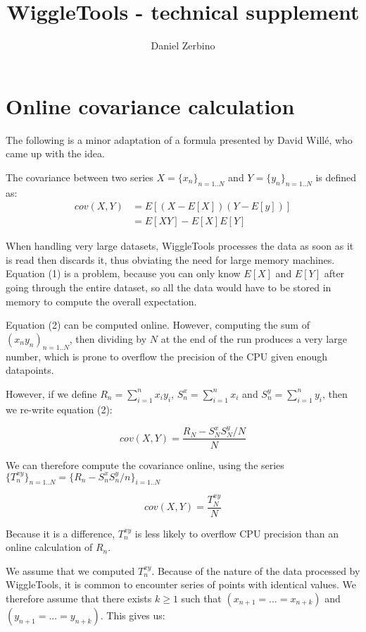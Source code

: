\documentclass[12pt]{article}
\begin{document}
\title{WiggleTools - technical supplement}
\author{Daniel Zerbino}
\maketitle

\section{Online covariance calculation}

The following is a minor adaptation of a formula presented by David Will\'e, who came up with the idea. 

The covariance between two series $X = \{x_n\}_{n=1..N}$ and $Y = \{y_n\}_{n=1..N}$ is defined as: 
\begin{align}
cov(X,Y) &= E[(X-E[X])(Y-E[y])] \\
               &= E[XY] - E[X]E[Y]
\end{align}

When handling very large datasets, WiggleTools processes the data as soon as it is read then discards it, thus obviating the need for large memory machines. Equation (1) is a problem, because you can only know $E[X]$ and $E[Y]$ after going through the entire dataset, so all the data would have to be stored in memory to compute the overall expectation.

Equation (2) can be computed online. However, computing the sum of $(x_ny_n)_{n=1..N}$, then dividing by $N$ at the end of the run produces a very large number, which is prone to overflow the precision of the CPU given enough datapoints. 

However, if we define $R_n = \sum_{i=1}^n x_iy_i$, $S_n^x =  \sum_{i=1}^n x_i$ and $S_n^y =  \sum_{i=1}^n y_i$, then we re-write equation (2):

$$cov(X,Y) = \frac{R_N-S_N^xS_N^y / N}{N}$$

We can therefore compute the covariance online, using the series $\{T^{xy}_n\}_{n=1..N} = \{R_n-S_n^xS_n^y / n\}_{i=1..N}$ 

$$cov(X,Y) = \frac{T^{xy}_N}{N}$$

Because it is a difference, $T^{xy}_n$ is less likely to overflow CPU precision than an online calculation of $R_n$.

We assume that we computed $T^{xy}_n$. Because of the nature of the data processed by WiggleTools, it is common to encounter series of points with identical values. We therefore assume that there exists $k \ge 1$ such that $(x_{n+1}=...=x_{n+k})$ and $(y_{n+1}=...=y_{n+k})$. This gives us:
\end{document}
